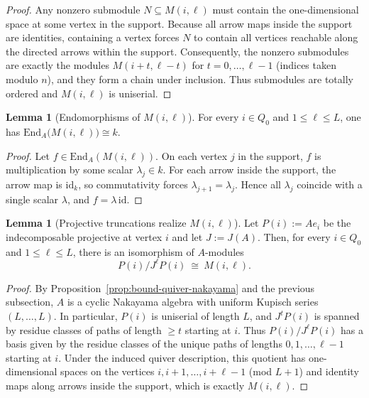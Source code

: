 \documentclass{article}
\theoremstyle{definition}
\newtheorem{lemma}[theorem]{Lemma}
\begin{document}
\begin{proof}
Any nonzero submodule $N\subseteq M(i,\ell)$ must contain the one-dimensional space at some vertex in the support.
Because all arrow maps inside the support are identities, containing a vertex forces $N$ to contain all vertices reachable along the directed arrows within the support.
Consequently, the nonzero submodules are exactly the modules
$M(i+t,\ell-t)$ for $t=0,\dots,\ell-1$ (indices taken modulo $n$), and they form a chain under inclusion.
Thus submodules are totally ordered and $M(i,\ell)$ is uniserial.
\end{proof}

\begin{lemma}[Endomorphisms of $M(i,\ell)$]\label{lem:Miell-end}
For every $i\in Q_0$ and $1\le \ell\le L$, one has $\mathrm{End}_A\big(M(i,\ell)\big)\cong k$.
\end{lemma}

\begin{proof}
Let $f\in \mathrm{End}_A(M(i,\ell))$.
On each vertex $j$ in the support, $f$ is multiplication by some scalar $\lambda_j\in k$.
For each arrow inside the support, the arrow map is $\mathrm{id}_k$, so commutativity forces $\lambda_{j+1}=\lambda_j$.
Hence all $\lambda_j$ coincide with a single scalar $\lambda$, and $f=\lambda\,\mathrm{id}$.
\end{proof}

\begin{lemma}[Projective truncations realize $M(i,\ell)$]\label{lem:Miell-as-truncation}
Let $P(i):=Ae_i$ be the indecomposable projective at vertex $i$ and let $J:=J(A)$.
Then, for every $i\in Q_0$ and $1\le \ell\le L$, there is an isomorphism of $A$-modules
\[
P(i)/J^{\ell}P(i)\ \cong\ M(i,\ell).
\]
\end{lemma}

\begin{proof}
By Proposition~\ref{prop:bound-quiver-nakayama} and the previous subsection, $A$ is a cyclic Nakayama algebra with uniform Kupisch series $(L,\ldots,L)$.
In particular, $P(i)$ is uniserial of length $L$, and $J^tP(i)$ is spanned by residue classes of paths of length $\ge t$ starting at $i$.
Thus $P(i)/J^{\ell}P(i)$ has a basis given by the residue classes of the unique paths of lengths $0,1,\dots,\ell-1$ starting at $i$.
Under the induced quiver description, this quotient has one-dimensional spaces on the vertices $i,i+1,\dots,i+\ell-1$ (mod $L+1$) and identity maps along arrows inside the support, which is exactly $M(i,\ell)$.
\end{proof}
\end{document}
